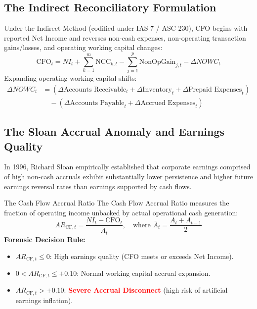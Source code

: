 \subsection{The Indirect Reconciliatory Formulation}
Under the Indirect Method (codified under IAS 7 / ASC 230), CFO begins with reported Net Income and reverses non-cash expenses, non-operating transaction gains/losses, and operating working capital changes:
\begin{equation}
\text{CFO}_t = NI_t + \sum_{k=1}^m \text{NCC}_{k,t} - \sum_{j=1}^p \text{NonOpGain}_{j,t} - \Delta NOWC_t
\label{eq:indirect_cfo}
\end{equation}
Expanding operating working capital shifts:
\begin{align}
\Delta NOWC_t &= (\Delta \text{Accounts Receivable}_t + \Delta \text{Inventory}_t + \Delta \text{Prepaid Expenses}_t) \nonumber \\
&\quad - (\Delta \text{Accounts Payable}_t + \Delta \text{Accrued Expenses}_t)
\end{align}

\subsection{The Sloan Accrual Anomaly and Earnings Quality}
In 1996, Richard Sloan empirically established that corporate earnings comprised of high non-cash accruals exhibit substantially lower persistence and higher future earnings reversal rates than earnings supported by cash flows.

\begin{definitionbox}{The Cash Flow Accrual Ratio}
The Cash Flow Accrual Ratio measures the fraction of operating income unbacked by actual operational cash generation:
\begin{equation}
AR_{\text{CF}, t} = \frac{NI_t - \text{CFO}_t}{\bar{A}_t}, \quad \text{where } \bar{A}_t = \frac{A_t + A_{t-1}}{2}
\label{eq:sloan_accrual}
\end{equation}
\textbf{Forensic Decision Rule:}
\begin{itemize}
    \item $AR_{\text{CF}, t} \le 0$: High earnings quality (CFO meets or exceeds Net Income).
    \item $0 < AR_{\text{CF}, t} \le +0.10$: Normal working capital accrual expansion.
    \item $AR_{\text{CF}, t} > +0.10$: \textcolor{red}{\textbf{Severe Accrual Disconnect}} (high risk of artificial earnings inflation).
\end{itemize}
\end{definitionbox}

